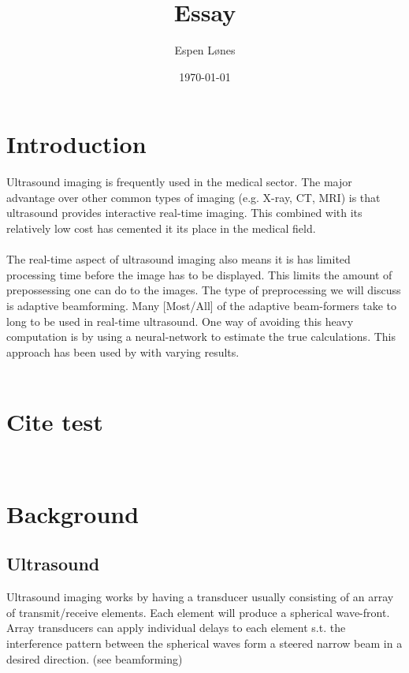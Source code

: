 \documentclass[12pt, a4paper, twoside, UKenglish]{article}
\title{Essay}
\author{Espen Lønes}
\date{\today}
\begin{document}
\maketitle

\tableofcontents{}
\listoffigures{}
\listoftables{}

\section{Introduction}
Ultrasound imaging is frequently used in the medical sector. The  major advantage over other common types of imaging (e.g. X-ray, CT, MRI) is that ultrasound provides interactive real-time imaging.
This combined with its relatively low cost has cemented it its place in the medical field.\\
\ \\
The real-time aspect of ultrasound imaging also means it is has limited processing time before the image has to be displayed. This limits the amount of prepossessing one can do to the images. The type of preprocessing we will discuss is adaptive beamforming. Many [Most/All] of the adaptive beam-formers take to long to be used in real-time ultrasound. One way of avoiding this heavy computation is by using a neural-network to estimate the true calculations. This approach has been used by \cite{Adaptive-Deep-Learning, Kjenstad} with varying results.\\
\ \\

\section{Cite test}
\cite{Krim-Viberg, Models-to-Deep, Rindal, DNN-beamforming, Kjenstad, NN-eigen, Simons, Adaptive-Deep-Learning}\\

\section{Background}

\subsection{Ultrasound}
Ultrasound imaging works by having a transducer usually consisting of an array of transmit/receive elements. Each element will produce a spherical wave-front. Array transducers can apply individual delays to each element s.t. the interference pattern between the spherical waves form a steered narrow beam in a desired direction. (see beamforming)\\
\ \\
\end{document}
